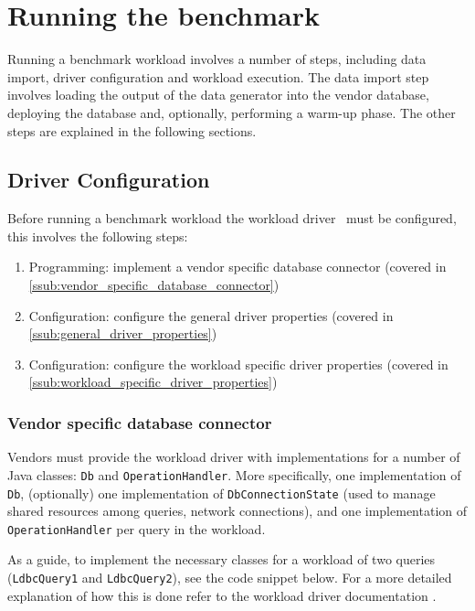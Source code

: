 \section{Running the benchmark}

Running a benchmark workload involves a number of steps, including data import, driver configuration and workload execution.
The data import step involves loading the output of the data generator into the vendor database,
deploying the database and, optionally, performing a warm-up phase.
The other steps are explained in the following sections.

\subsection{Driver Configuration}
\label{sub:driver_configuration}

Before running a benchmark workload the workload driver~\cite{test_driver} must be configured, this involves the following steps:
\begin{enumerate}
	\item Programming: implement a vendor specific database connector (covered in \autoref{ssub:vendor_specific_database_connector})
	\item Configuration: configure the general driver properties (covered in \autoref{ssub:general_driver_properties})
	\item Configuration: configure the workload specific driver properties (covered in \autoref{ssub:workload_specific_driver_properties})
\end{enumerate}

\subsubsection{Vendor specific database connector}
\label{ssub:vendor_specific_database_connector}
Vendors must provide the workload driver with implementations for a number of Java classes: \texttt{Db} and \texttt{OperationHandler}.
More specifically, one implementation of \texttt{Db},
(optionally) one implementation of \texttt{DbConnectionState} (used to manage shared resources among queries, \eg network connections),
and one implementation of \texttt{OperationHandler} per query in the workload.

As a guide, to implement the necessary classes for a workload of two queries (\texttt{LdbcQuery1} and \texttt{LdbcQuery2}),
see the code snippet below.
For a more detailed explanation of how this is done refer to the workload driver documentation \cite{test_driver}.

